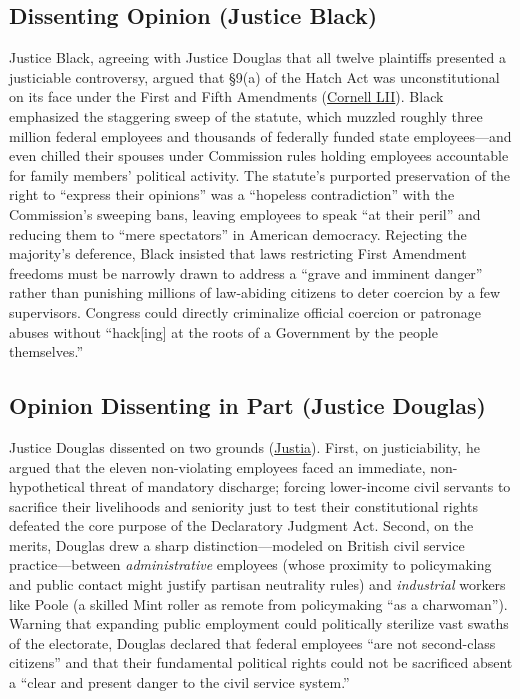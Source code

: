 \documentclass[12pt]{article}
\begin{document}
\subsection{Dissenting Opinion (Justice Black)}

Justice Black, agreeing with Justice Douglas that all twelve plaintiffs presented a justiciable controversy, argued that \S 9(a) of the Hatch Act was unconstitutional on its face under the First and Fifth Amendments (\href{https://www.law.cornell.edu/supremecourt/text/330/75}{Cornell LII}). Black emphasized the staggering sweep of the statute, which muzzled roughly three million federal employees and thousands of federally funded state employees---and even chilled their spouses under Commission rules holding employees accountable for family members' political activity. The statute's purported preservation of the right to ``express their opinions'' was a ``hopeless contradiction'' with the Commission's sweeping bans, leaving employees to speak ``at their peril'' and reducing them to ``mere spectators'' in American democracy. Rejecting the majority's deference, Black insisted that laws restricting First Amendment freedoms must be narrowly drawn to address a ``grave and imminent danger'' rather than punishing millions of law-abiding citizens to deter coercion by a few supervisors. Congress could directly criminalize official coercion or patronage abuses without ``hack[ing] at the roots of a Government by the people themselves.''

\subsection{Opinion Dissenting in Part (Justice Douglas)}

Justice Douglas dissented on two grounds (\href{https://supreme.justia.com/cases/federal/us/330/75/}{Justia}). First, on justiciability, he argued that the eleven non-violating employees faced an immediate, non-hypothetical threat of mandatory discharge; forcing lower-income civil servants to sacrifice their livelihoods and seniority just to test their constitutional rights defeated the core purpose of the Declaratory Judgment Act. Second, on the merits, Douglas drew a sharp distinction---modeled on British civil service practice---between \emph{administrative} employees (whose proximity to policymaking and public contact might justify partisan neutrality rules) and \emph{industrial} workers like Poole (a skilled Mint roller as remote from policymaking ``as a charwoman''). Warning that expanding public employment could politically sterilize vast swaths of the electorate, Douglas declared that federal employees ``are not second-class citizens'' and that their fundamental political rights could not be sacrificed absent a ``clear and present danger to the civil service system.''
\end{document}
